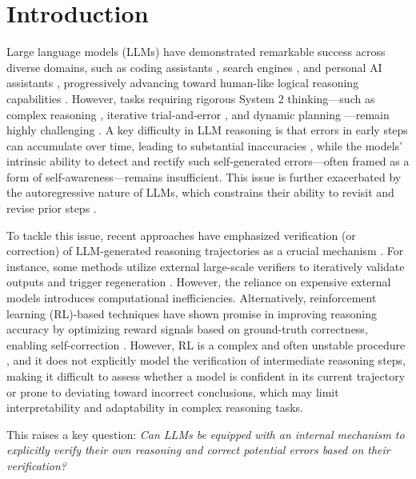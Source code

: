 \section{Introduction}
\label{sec:intro}

Large language models (LLMs) have demonstrated remarkable success across diverse domains, such as coding assistants \citep{zhang2024codeagent}, search engines \citep{xiong2024search}, and personal AI assistants \citep{sajja2024artificial}, progressively advancing toward human-like logical reasoning capabilities \citep{amir2024tomeval}. However, tasks requiring rigorous System 2 thinking—such as complex reasoning \citep{jaech2024openaio1}, iterative trial-and-error \citep{song2024trial}, and dynamic planning \citep{xie2024humanplan}—remain highly challenging \citep{lowe2024system, cai2024systemmath}. A key difficulty in LLM reasoning is that errors in early steps can accumulate over time, leading to substantial inaccuracies \citep{lecun2022path}, while the models’ intrinsic ability to detect and rectify such self-generated errors—often framed as a form of self-awareness—remains insufficient. This issue is further exacerbated by the autoregressive nature of LLMs, which constrains their ability to revisit and revise prior steps \citep{bachmann2024pitfalls}.


To tackle this issue, recent approaches have emphasized verification (or correction) of LLM-generated reasoning trajectories as a crucial mechanism \citep{zhang2024mathmcts, madaan2023selfrefine}. For instance, some methods utilize external large-scale verifiers to iteratively validate outputs and trigger regeneration \citep{luo2024improve}. However, the reliance on expensive external models introduces computational inefficiencies. Alternatively, reinforcement learning (RL)-based techniques have shown promise in improving reasoning accuracy by optimizing reward signals based on ground-truth correctness, enabling self-correction \citep{kumar2024score}. However, RL is a complex and often unstable procedure \citep{mnih2015human, rafailov2023DPO}, and it does not explicitly model the verification of intermediate reasoning steps, making it difficult to assess whether a model is confident in its current trajectory or prone to deviating toward incorrect conclusions, which may limit interpretability and adaptability in complex reasoning tasks.

This raises a key question: \textit{Can LLMs be equipped with an internal mechanism to explicitly verify their own reasoning and correct potential errors based on their verification?}

